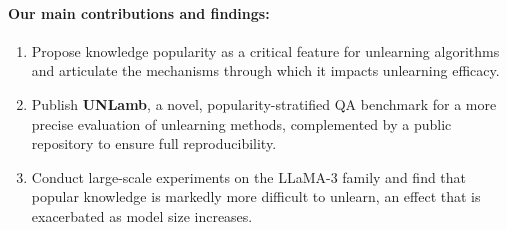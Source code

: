\paragraph{Our main contributions and findings:}
\begin{enumerate}
    \item Propose knowledge popularity as a critical feature for unlearning algorithms and articulate the mechanisms through which it impacts unlearning efficacy.
    \item Publish \textbf{UNLamb}, a novel, popularity-stratified QA benchmark for a more precise evaluation of unlearning methods, complemented by a public repository to ensure full reproducibility.
    \item Conduct large-scale experiments on the LLaMA-3 family and find that popular knowledge is markedly more difficult to unlearn, an effect that is exacerbated as model size increases.
\end{enumerate}



